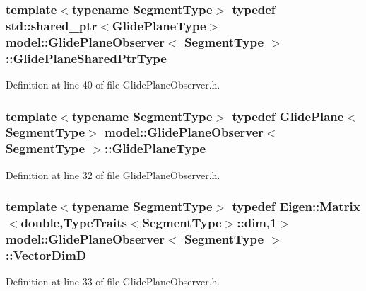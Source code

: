 \subsubsection[{Glide\+Plane\+Shared\+Ptr\+Type}]{\setlength{\rightskip}{0pt plus 5cm}template$<$typename Segment\+Type$>$ typedef std\+::shared\+\_\+ptr$<${\bf Glide\+Plane\+Type}$>$ {\bf model\+::\+Glide\+Plane\+Observer}$<$ Segment\+Type $>$\+::{\bf Glide\+Plane\+Shared\+Ptr\+Type}}\label{structmodel_1_1_glide_plane_observer_a1db5edc59e298b9504e29de2081973c4}


Definition at line 40 of file Glide\+Plane\+Observer.\+h.

\hypertarget{structmodel_1_1_glide_plane_observer_afb0ef99e698d5e00236daf826f0ccfb0}{}
\subsubsection[{Glide\+Plane\+Type}]{\setlength{\rightskip}{0pt plus 5cm}template$<$typename Segment\+Type$>$ typedef {\bf Glide\+Plane}$<$Segment\+Type$>$ {\bf model\+::\+Glide\+Plane\+Observer}$<$ Segment\+Type $>$\+::{\bf Glide\+Plane\+Type}}\label{structmodel_1_1_glide_plane_observer_afb0ef99e698d5e00236daf826f0ccfb0}


Definition at line 32 of file Glide\+Plane\+Observer.\+h.

\hypertarget{structmodel_1_1_glide_plane_observer_a3ac9c571b18b2bf2043a7e74cb73fc80}{}
\subsubsection[{Vector\+Dim\+D}]{\setlength{\rightskip}{0pt plus 5cm}template$<$typename Segment\+Type$>$ typedef Eigen\+::\+Matrix$<$double,{\bf Type\+Traits}$<$Segment\+Type$>$\+::{\bf dim},1$>$ {\bf model\+::\+Glide\+Plane\+Observer}$<$ Segment\+Type $>$\+::{\bf Vector\+Dim\+D}}\label{structmodel_1_1_glide_plane_observer_a3ac9c571b18b2bf2043a7e74cb73fc80}


Definition at line 33 of file Glide\+Plane\+Observer.\+h.

\hypertarget{structmodel_1_1_glide_plane_observer_af9001f8c11da2a2812813d2a53c14c46}{}
